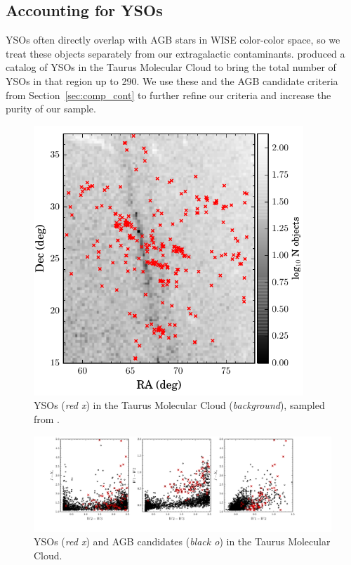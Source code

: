 \subsection{Accounting for YSOs}\label{sec:kill_ysos}
YSOs often directly overlap with AGB stars in WISE color-color space, so we treat these objects separately from our  extragalactic contaminants. \cite{2011ApJS..196....4R} produced a catalog of YSOs in the Taurus Molecular Cloud to bring the total number of YSOs in that region up to 290. We use these and the AGB candidate criteria from Section~\ref{sec:comp_cont} to further refine our criteria and increase the purity of our sample.

\begin{figure}[h]
\includegraphics[width=4in]{figs/taurus_field_YSOs.pdf}
\caption{YSOs (\emph{red x}) in the Taurus Molecular Cloud (\emph{background}), sampled from \citep{2011ApJS..196....4R}.\label{fig:yso_field}}
\end{figure}
\begin{figure}[h]
\includegraphics[width=6.5in]{figs/ysos_taurus_color.pdf}
\caption{YSOs (\emph{red x}) and AGB candidates (\emph{black o}) in the Taurus Molecular Cloud. \label{fig:ysos_agbs_taurus}}
\end{figure}

